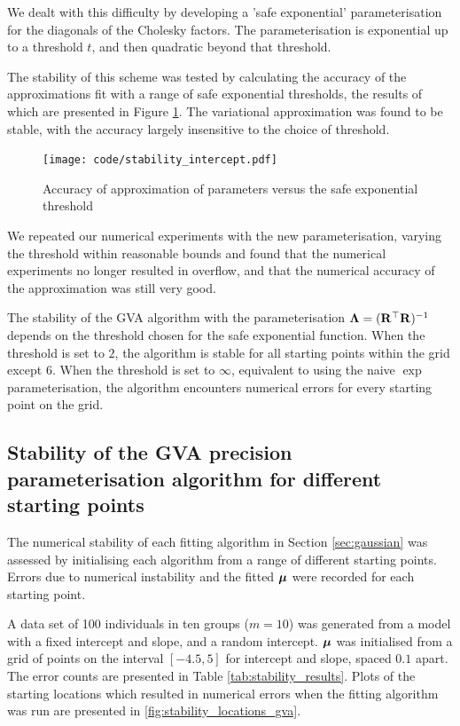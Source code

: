 \documentclass{amsart}[12pt]
\begin{document}
			We dealt with this difficulty by developing a 'safe exponential' parameterisation for the diagonals of the
			Cholesky factors. The parameterisation is exponential up to a threshold $t$, and then quadratic beyond that
			threshold.
			
			The stability of this scheme was tested by calculating the accuracy of the approximations fit with a range
			of safe exponential thresholds, the results of which are presented in Figure \ref{fig:stability_accuracy}.
			The variational approximation was found to be stable, with the accuracy largely insensitive to the choice of
			threshold.
			
			\begin{figure}
				\label{fig:stability_accuracy}
				\caption{Accuracy of approximation of parameters versus the safe exponential threshold}
				\texttt{[image: code/stability\_intercept.pdf]}
			\end{figure}
			
			We repeated our numerical experiments with the new parameterisation, varying the threshold within reasonable
			bounds and found that the numerical experiments no longer resulted in overflow, and that the numerical accuracy
			of the approximation was still very good.
			
			The stability of the GVA algorithm with the parameterisation ${\boldsymbol \Lambda} = ({\bf R}^\top {\bf R})^{-1}$ depends on the
			threshold chosen for the safe exponential function. When the threshold is set to $2$, the algorithm is stable
			for all starting points within the grid except $6$. When the threshold is set to $\infty$, equivalent to using
			the naive $\exp$ parameterisation, the algorithm encounters numerical errors for every starting point on the 
			grid.
				
			\subsection{Stability of the GVA precision parameterisation algorithm for different starting points}
					
			The numerical stability of each fitting algorithm in Section \ref{sec:gaussian} was assessed by initialising
			each algorithm from a range of different starting points. Errors due to numerical instability and the fitted
			${\boldsymbol \mu}$ were recorded for each starting point.
					
			A data set of 100 individuals in ten groups ($m=10$) was generated from a model with a fixed intercept and
			slope, and a random intercept. ${\boldsymbol \mu}$ was initialised from a grid of points on the interval $[-4.5, 5]$ for
			intercept and slope, spaced $0.1$ apart. The error counts are presented in Table
			\ref{tab:stability_results}. Plots of the starting locations which resulted in numerical errors when the
			fitting algorithm was run are presented in \ref{fig:stability_locations_gva}.
					
\end{document}
